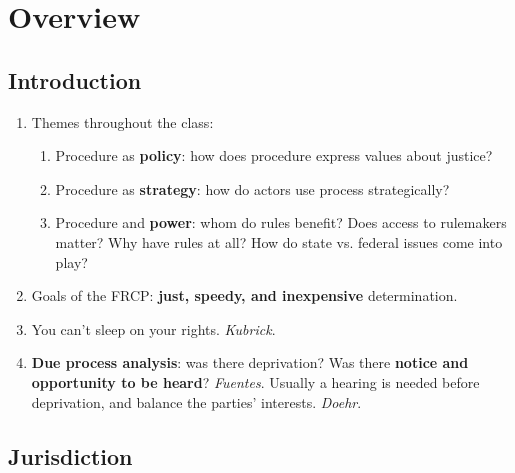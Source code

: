 \section{Overview}

\subsection{Introduction}

\begin{enumerate}
    \item Themes throughout the class:
    \begin{enumerate}
        \item Procedure as \textbf{policy}: how does procedure express values 
        about justice?
        \item Procedure as \textbf{strategy}: how do actors use process 
        strategically?
        \item Procedure and \textbf{power}: whom do rules benefit? Does access 
        to rulemakers matter? Why have rules at all? How do state vs. federal 
        issues come into play?
    \end{enumerate}
    \item Goals of the FRCP: \textbf{just, speedy, and inexpensive} 
    determination.
    \item You can't sleep on your rights. \emph{Kubrick}.
    \item \textbf{Due process analysis}: was there deprivation? Was there 
    \textbf{notice and opportunity to be heard}? \emph{Fuentes}. Usually a 
    hearing is needed before deprivation, and balance the parties' interests.  
    \emph{Doehr}.  \end{enumerate}

\subsection{Jurisdiction}

